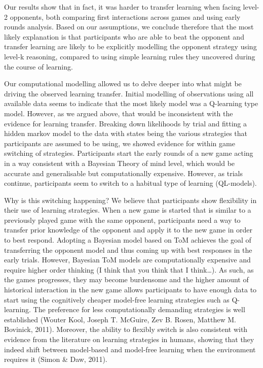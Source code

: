 \documentclass[man,floatsintext]{apa6}
\begin{document}
Our results show that in fact, it was harder to transfer learning when facing level-2 opponents, both comparing first interactions across games and using early rounds analysis. Based on our assumptions, we conclude therefore that the most likely explanation is that participants who are able to beat the opponent and transfer learning are likely to be explicitly modelling the opponent strategy using level-k reasoning, compared to using simple learning rules they uncovered during the course of learning.

Our computational modelling allowed us to delve deeper into what might be driving the observed learning transfer. Initial modelling of observations using all available data seems to indicate that the most likely model was a Q-learning type model. However, as we argued above, that would be inconsistent with the evidence for learning transfer. Breaking down likelihoods by trial and fitting a hidden markov model to the data with states being the various strategies that participants are assumed to be using, we showed evidence for within game switching of strategies. Participants start the early rounds of a new game acting in a way consistent with a Bayesian Theory of mind level, which would be accurate and generalisable but computationally expensive. However, as trials continue, participants seem to switch to a habitual type of learning (QL-models).

Why is this switching happening? We believe that participants show flexibility in their use of learning strategies. When a new game is started that is similar to a previously played game with the same opponent, participants need a way to transfer prior knowledge of the opponent and apply it to the new game in order to best respond. Adopting a Bayesian model based on ToM achieves the goal of transferring the opponent model and thus coming up with best responses in the early trials. However, Bayesian ToM models are computationally expensive and require higher order thinking (I think that you think that I think\ldots{}). As such, as the games progresses, they may become burdensome and the higher amount of historical interaction in the new game allows participants to have enough data to start using the cognitively cheaper model-free learning strategies such as Q-learning. The preference for less computationally demanding strategies is well established (Wouter Kool, Joseph T. McGuire, Zev B. Rosen, Matthew M. Bovinick, 2011). Moreover, the ability to flexibly switch is also consistent with evidence from the literature on learning strategies in humans, showing that they indeed shift between model-based and model-free learning when the environment requires it (Simon \& Daw, 2011).
\end{document}
